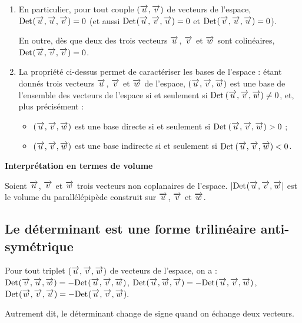 \documentclass[10pt,oneside]{article}
\newcommand{\Det}{\mathrm{Det}\hspace{.2mm}}
\begin{document}
\begin{rem}

\begin{enumerate}
\item En particulier, pour tout couple $(\overrightarrow{u}, \overrightarrow{v})$ de vecteurs de l'espace, $\Det(\vect{u}, \vect{u}, \vect{v})=0$ (et aussi $\Det(\vect{u}, \vect{v}, \vect{u})=0$ et $\Det(\vect{v}, \vect{u}, \vect{u})=0$).

En outre, dès que deux des trois vecteurs $\overrightarrow{u}$, $\overrightarrow{v}$ et $\overrightarrow{w}$ sont colinéaires, $\Det(\vect{u},\vect{v}, \vect{v})=0$.
\item La propriété ci-dessus permet de caractériser les bases de l'espace : étant donnés trois vecteurs $\overrightarrow{u}$, $\overrightarrow{v}$ et $\overrightarrow{w}$ de l'espace, $(\overrightarrow{u}, \overrightarrow{v}, \overrightarrow{w})$ est une base de l'ensemble des vecteurs de l'espace si et seulement si $\Det\left(\vect{u}, \vect{v}, \vect{w}\right) \neq 0$, et, plus précisément :
	\begin{itemize}\renewcommand{\labelitemi}{$\bullet$}
	\item $(\overrightarrow{u}, \overrightarrow{v}, \overrightarrow{w})$ est une base directe si et seulement si $\Det\left(\vect{u}, \vect{v}, \vect{w}\right)>0$ ;
	\item $(\overrightarrow{u}, \overrightarrow{v}, \overrightarrow{w})$ est une base indirecte si et seulement si $\Det\left(\vect{u}, \vect{v}, \vect{w}\right)<0$.\\
	\end{itemize}
\end{enumerate}
\end{rem}

\begin{rem}
\textbf{Interprétation en termes de volume}

Soient $\overrightarrow{u}$, $\overrightarrow{v}$ et $\overrightarrow{w}$ trois vecteurs non coplanaires de l'espace.
$|\Det(\vect{u}, \vect{v}, \vect{w}|$ est le volume du parallélépipède construit sur $\overrightarrow{u}$, $\overrightarrow{v}$ et $\overrightarrow{w}$.\\

\end{rem}

\subsection{Le déterminant est une forme trilinéaire anti-symétrique}

\begin{propo}

Pour tout triplet $(\overrightarrow{u}, \overrightarrow{v}, \overrightarrow{w})$ de vecteurs de l'espace, on a :
$\Det(\vect{v},\vect{u}, \vect{w})=-\Det(\vect{u},\vect{v}, \vect{w})$, $\Det(\vect{u},\vect{w}, \vect{v})=-\Det(\vect{u},\vect{v}, \vect{w})$, $\Det(\vect{w},\vect{v}, \vect{u})=-\Det(\vect{u},\vect{v}, \vect{w}).$

Autrement dit, le déterminant change de signe quand on échange deux vecteurs.
\end{propo}
\end{document}
